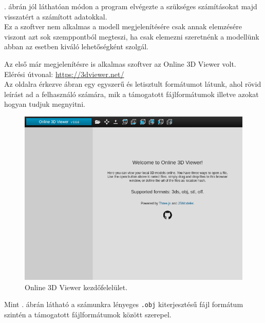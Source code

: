 . ábrán jól láthatóan módon a program elvégezte a szükséges számításokat majd visszatért a számított adatokkal.\\

Ez a szoftver nem alkalmas a modell megjelenítésére csak annak elemzésére viszont azt sok szemppontból megteszi, ha csak elemezni szeretnénk a modellünk abban az esetben kiváló lehetőségként szolgál.
\newpage
{}

Az első már megjelenítésre is alkalmas szoftver az Online 3D Viewer volt.\cite{online2014viktor}\\
Elérési útvonal: \url{https://3dviewer.net/}\\

Az oldalra érkezve  ábran egy egyszerű és letisztult formátumot látunk, ahol rövid leírást ad a felhasználó számára, mik a támogatott fájlformátumok illetve azokat hogyan tudjuk megnyitni. 
\begin{figure}[h]
\centering
\includegraphics[width=\textwidth]{images/Model_Viewer.png}
\caption{Online 3D Viewer kezdőfelelület.}
\label{fig:model_viewer1}
\end{figure}

Mint . ábrán látható a számunkra lényeges \texttt{.obj} kiterjesztésű fájl formátum szintén a támogatott fájlformátumok között szerepel.\\

